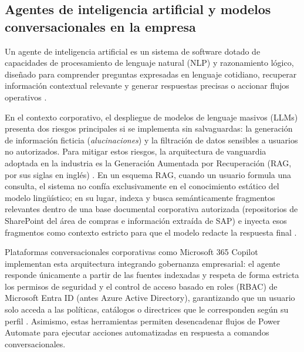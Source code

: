 \subsection{Agentes de inteligencia artificial y modelos conversacionales en la empresa}

Un agente de inteligencia artificial es un sistema de software dotado de capacidades de procesamiento de lenguaje natural (NLP) y razonamiento lógico, diseñado para comprender preguntas expresadas en lenguaje cotidiano, recuperar información contextual relevante y generar respuestas precisas o accionar flujos operativos \cite{davenport2018ai, guida2023ai}.

En el contexto corporativo, el despliegue de modelos de lenguaje masivos (LLMs) presenta dos riesgos principales si se implementa sin salvaguardas: la generación de información ficticia (\emph{alucinaciones}) y la filtración de datos sensibles a usuarios no autorizados. Para mitigar estos riesgos, la arquitectura de vanguardia adoptada en la industria es la Generación Aumentada por Recuperación (RAG, por sus siglas en inglés) \cite{lewis2020rag}. En un esquema RAG, cuando un usuario formula una consulta, el sistema no confía exclusivamente en el conocimiento estático del modelo lingüístico; en su lugar, indexa y busca semánticamente fragmentos relevantes dentro de una base documental corporativa autorizada (repositorios de SharePoint del área de compras e información extraída de SAP) e inyecta esos fragmentos como contexto estricto para que el modelo redacte la respuesta final \cite{microsoft2026knowledgeSources}.

Plataformas conversacionales corporativas como Microsoft 365 Copilot implementan esta arquitectura integrando gobernanza empresarial: el agente responde únicamente a partir de las fuentes indexadas y respeta de forma estricta los permisos de seguridad y el control de acceso basado en roles (RBAC) de Microsoft Entra ID (antes Azure Active Directory), garantizando que un usuario solo acceda a las políticas, catálogos o directrices que le corresponden según su perfil \cite{microsoft2026copilotStudioOverview, microsoft2026agentFlows}. Asimismo, estas herramientas permiten desencadenar flujos de Power Automate para ejecutar acciones automatizadas en respuesta a comandos conversacionales.
